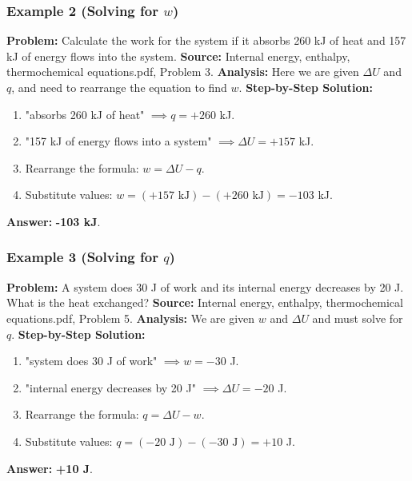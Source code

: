 \documentclass{article}
\begin{document}
\subsubsection{Example 2 (Solving for $w$)}
\textbf{Problem:} Calculate the work for the system if it absorbs 260 kJ of heat and 157 kJ of energy flows into the system.
\textbf{Source:} Internal energy, enthalpy, thermochemical equations.pdf, Problem 3.
\textbf{Analysis:} Here we are given $\Delta U$ and $q$, and need to rearrange the equation to find $w$.
\textbf{Step-by-Step Solution:}
\begin{enumerate}
    \item "absorbs 260 kJ of heat" $\implies q = +260$ kJ.
    \item "157 kJ of energy flows into a system" $\implies \Delta U = +157$ kJ.
    \item Rearrange the formula: $w = \Delta U - q$.
    \item Substitute values: $w = (+157 \text{ kJ}) - (+260 \text{ kJ}) = -103$ kJ.
\end{enumerate}
\textbf{Answer:} \textbf{-103 kJ}.

\subsubsection{Example 3 (Solving for $q$)}
\textbf{Problem:} A system does 30 J of work and its internal energy decreases by 20 J. What is the heat exchanged?
\textbf{Source:} Internal energy, enthalpy, thermochemical equations.pdf, Problem 5.
\textbf{Analysis:} We are given $w$ and $\Delta U$ and must solve for $q$.
\textbf{Step-by-Step Solution:}
\begin{enumerate}
    \item "system does 30 J of work" $\implies w = -30$ J.
    \item "internal energy decreases by 20 J" $\implies \Delta U = -20$ J.
    \item Rearrange the formula: $q = \Delta U - w$.
    \item Substitute values: $q = (-20 \text{ J}) - (-30 \text{ J}) = +10$ J.
\end{enumerate}
\textbf{Answer:} \textbf{+10 J}.
\end{document}
